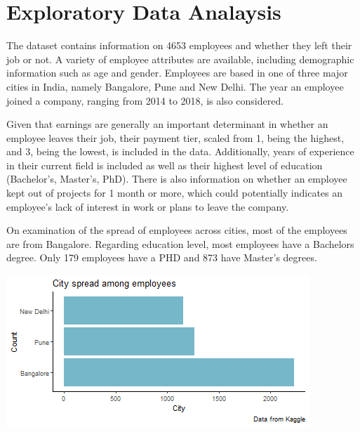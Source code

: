 \documentclass[11pt,preprint, authoryear]{elsarticle}
\let\origfigure\figure
\let\endorigfigure\endfigure
\renewenvironment{figure}[1][2] {
    \expandafter\origfigure\expandafter[H]
} {
    \endorigfigure
}
\numberwithin{equation}{section}
\numberwithin{figure}{section}
\numberwithin{table}{section}
\begin{document}
\hypertarget{exploratory-data-analaysis}{%
\section*{Exploratory Data Analaysis}\label{exploratory-data-analaysis}}

The dataset contains information on 4653 employees and whether they left
their job or not. A variety of employee attributes are available,
including demographic information such as age and gender. Employees are
based in one of three major cities in India, namely Bangalore, Pune and
New Delhi. The year an employee joined a company, ranging from 2014 to
2018, is also considered.

Given that earnings are generally an important determinant in whether an
employee leaves their job, their payment tier, scaled from 1, being the
highest, and 3, being the lowest, is included in the data. Additionally,
years of experience in their current field is included as well as their
highest level of education (Bachelor's, Master's, PhD). There is also
information on whether an employee kept out of projects for 1 month or
more, which could potentially indicates an employee's lack of interest
in work or plans to leave the company.

On examination of the spread of employees across cities, most of the
employees are from Bangalore. Regarding education level, most employees
have a Bachelors degree. Only 179 employees have a PHD and 873 have
Master's degrees.

\begin{figure}[H]

{\centering \includegraphics{Final_project_files/figure-latex/Figure1-1} 

}

\caption{City Spread \label{Figure1}}\label{fig:Figure1}
\end{figure}
\end{document}

